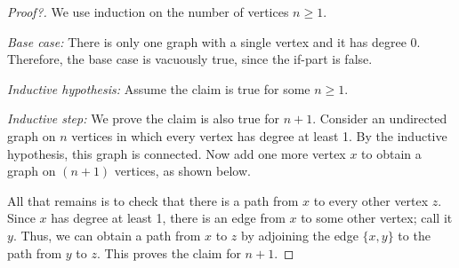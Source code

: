 \documentclass[11pt]{article}
\begin{document}
\begin{proof}[Proof?]
  We use induction on the number of vertices $n \ge 1$.

\emph{Base case:} There is only one graph with a single vertex and it has degree 0. Therefore, the base case is vacuously true, since the if-part is false.

\emph{Inductive hypothesis:} Assume the claim is true for some $n \ge 1$.

\emph{Inductive step:} We prove the claim is also true for $n+1$. Consider an undirected graph on $n$ vertices in which every vertex has degree at least 1. By the inductive hypothesis, this graph is connected. Now add one more vertex $x$ to obtain a graph on $(n + 1)$ vertices, as shown below.
\begin{center}
\end{center}
All that remains is to check that there is a path from $x$ to every other vertex $z$. Since $x$
has degree at least 1, there is an edge from $x$ to some other vertex; call it $y$. Thus, we
can obtain a path from $x$ to $z$ by adjoining the edge $\{x,y\}$ to the path from $y$ to $z$. This
proves the claim for $n+1$. 
\end{proof}
\end{document}
